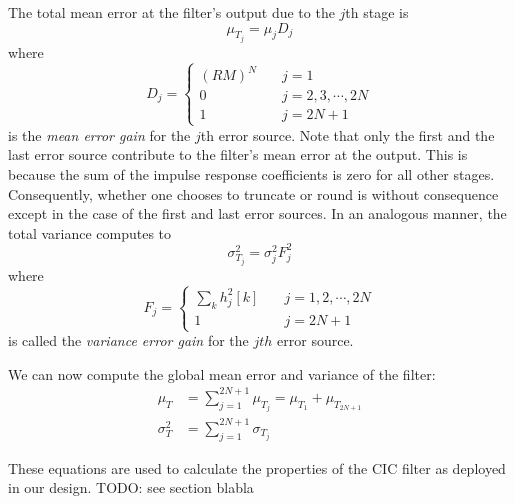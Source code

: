 The total mean error at the filter's output due to the $j$th stage is
\begin{equation}
    \label{eq:cic:truncation_rounding:total_mean_error_jth_stage}
    \mu_{T_j} = \mu_jD_j
\end{equation}
where
\begin{equation}
    \label{eq:cic:truncation_rounding:mean_error_gain}
    D_j = \left\lbrace
        \begin{aligned}
            (RM)^N         & \quad j = 1\\
            0              & \quad j = 2, 3, \cdots, 2N\\
            1              & \quad j = 2N+1
        \end{aligned}
    \right.
\end{equation}
is the \emph{mean  error gain} for the $j$th error  source. Note that only the
first and the last  error source contribute to the filter's  mean error at the
output. This is because  the sum of the impulse response  coefficients is zero
for all other  stages. Consequently, whether one chooses to  truncate or round
is  without  consequence except  in  the  case of  the  first  and last  error
sources. In an analogous manner, the total variance computes to
\begin{equation}
    \label{eq:cic:truncation_rounding:total_variance_jth_stage}
    \sigma_{T_j}^2 = \sigma_j^2F_j^2
\end{equation}
where
\begin{equation}
    \label{eq:cic:truncation_rounding:variance_error_gain}
    F_j = \left\lbrace
        \begin{aligned}
            \sum_k h_j^2[k]  & \quad j = 1, 2, \cdots, 2N\\
            1                & \quad j = 2N+1
        \end{aligned}
    \right.
\end{equation}
is called the \emph{variance error gain} for the $jth$ error source.

We can now compute the global mean error and variance of the filter:
\begin{align}
    \label{eq:cic:truncation_rounding:global:mean_error}
    \mu_T &= \sum_{j = 1}^{2N+1} \mu_{T_j} = \mu_{T_1} + \mu_{T_{2N+1}}\\
    \label{eq:cic:truncation_rounding:global:variance}
    \sigma_{T}^2 &= \sum_{j=1}^{2N+1} \sigma_{T_j}
\end{align}

These equations  are used  to calculate  the properties of  the CIC  filter as
deployed in our design. TODO: see section blabla

